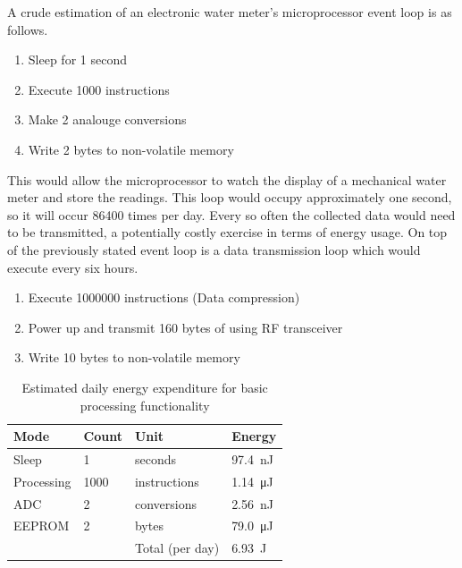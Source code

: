     A crude estimation of an electronic water meter's microprocessor event loop is as follows.
    \begin{enumerate}
      \item Sleep for 1 second
      \item Execute 1000 instructions
      \item Make 2 analouge conversions
      \item Write 2 bytes to non-volatile memory
    \end{enumerate}
    This would allow the microprocessor to watch the display of a mechanical water meter and store the readings.
    This loop would occupy approximately one second, so it will occur 86400 times per day.
    Every so often the collected data would need to be transmitted, a potentially costly exercise in terms of energy usage.
    On top of the previously stated event loop is a data transmission loop which would execute every six hours.
    \begin{enumerate}
      \item Execute 1000000 instructions (Data compression)
      \item Power up and transmit 160 bytes of using RF transceiver
      \item Write 10 bytes to non-volatile memory
    \end{enumerate}

    \begin{table}
      \centering
      \begin{tabular}{|l|l|l|l|}
        \hline
        Mode & Count & Unit & Energy \\ \hline
        Sleep & 1 & seconds & \SI{97.4}{\nano\joule} \\
        Processing & 1000 & instructions & \SI{1.14}{\micro\joule} \\
        ADC & 2 & conversions & \SI{2.56}{\nano\joule} \\
        EEPROM & 2 & bytes & \SI{79.0}{\micro\joule} \\ \hline \hline
        &&Total (per day) & \SI{6.93}{\joule} \\ \hline
      \end{tabular}
      \caption{\label{tab:EnergyBudget-EventLoop} Estimated daily energy expenditure for basic processing functionality}
    \end{table}

